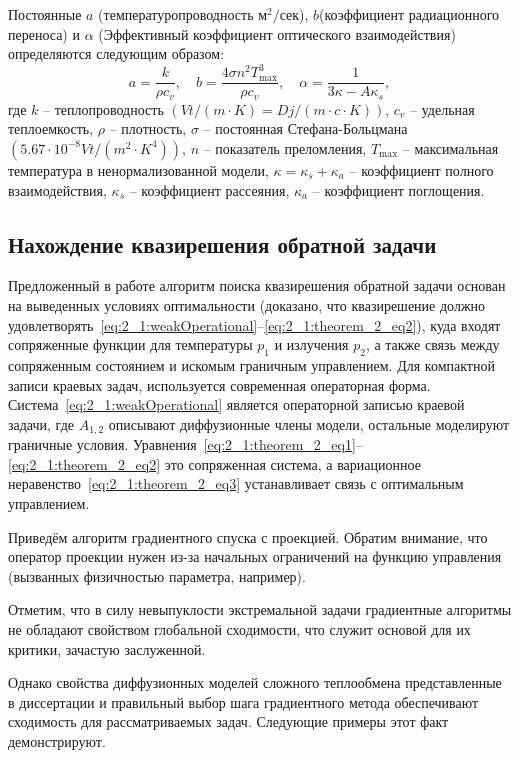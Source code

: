 \documentclass[8pt,a4paper]{article}
\begin{document}
    Постоянные $a$ (температуропроводность $м^2/сек$), $b$(коэффициент радиационного переноса) и
    $\alpha$ (Эффективный коэффициент оптического взаимодействия)
    определяются следующим образом:
    \[
        a = \frac{k}{\rho c_v},\quad b = \frac{4\sigma n^2 T_{\max}^3}{\rho c_v},
        \quad \alpha=\frac{1}{3\kappa - A \kappa_s},
    \]
    где $k$ -- теплопроводность $(Vt/(m \cdot K)=Dj/(m \cdot c \cdot K))$, $c_v$ -- удельная теплоемкость,
    $\rho$ -- плотность,
    $\sigma$ -- постоянная Стефана-Больцмана $(5.67 \cdot 10^{-8}Vt/(m^2 \cdot K^4))$,
    $n$ -- показатель преломления,
    $T_{\max}$ -- максимальная температура в ненормализованной модели,
    $\kappa = \kappa_s + \kappa_a$ -- коэффициент
    полного взаимодействия,
    $\kappa_s$ -- коэффициент рассеяния, $\kappa_a$ -- коэффициент поглощения.

    \vspace{10cm}
    \subsection*{Нахождение квазирешения обратной задачи}
    Предложенный в работе алгоритм поиска квазирешения обратной задачи основан
    на выведенных условиях оптимальности
    (доказано, что квазирешение должно
    удовлетворять~\eqref{eq:2_1:weakOperational}--\eqref{eq:2_1:theorem_2_eq2}),
    куда входят сопряженные функции для температуры $p_1$ и излучения $p_2$,
    а также связь между сопряженным состоянием и искомым граничным управлением.
    Для компактной записи краевых задач, используется современная операторная форма.
    Система~\eqref{eq:2_1:weakOperational} является операторной записью краевой задачи,
    где $A_{1,2}$ описывают диффузионные члены модели, остальные моделируют граничные условия.
    Уравнения~\eqref{eq:2_1:theorem_2_eq1}--\eqref{eq:2_1:theorem_2_eq2}
    это сопряженная система,
    а вариационное неравенство~\eqref{eq:2_1:theorem_2_eq3}
    устанавливает связь с оптимальным управлением.

    Приведём алгоритм градиентного спуска с проекцией.
    Обратим внимание, что оператор проекции нужен
    из-за начальных ограничений на функцию управления
    (вызванных физичностью параметра, например).

    Отметим, что в силу невыпуклости экстремальной задачи градиентные алгоритмы не обладают
    свойством глобальной сходимости, что служит основой для их критики, зачастую заслуженной.

    Однако свойства диффузионных моделей сложного теплообмена представленные в диссертации
    и правильный выбор шага градиентного метода обеспечивают сходимость для
    рассматриваемых задач.
    Следующие примеры этот факт демонстрируют.
\end{document}
